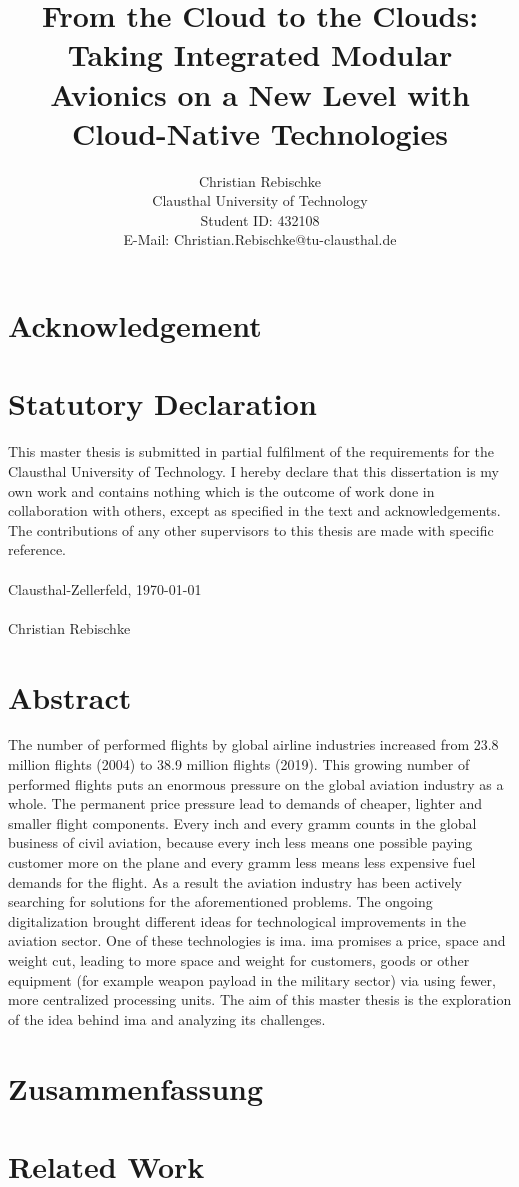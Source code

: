 \documentclass[titlepage]{report}
\title{From the Cloud to the Clouds: Taking Integrated Modular Avionics on a New Level with Cloud-Native Technologies}
\author{Christian Rebischke\\
Clausthal University of Technology\\
Student ID: 432108 \\
E-Mail: Christian.Rebischke@tu-clausthal.de}
\begin{document}
\maketitle
\chapter*{Acknowledgement}
\chapter*{Statutory Declaration}
This master thesis is submitted in partial fulfilment of the requirements for the Clausthal
University of Technology. I hereby declare that this dissertation is my own work and
contains nothing which is the outcome of work done in collaboration with others,
except as specified in the text and acknowledgements. The contributions of any other
supervisors to this thesis are made with specific reference.
\\
\\
Clausthal-Zellerfeld, \today
\\
\\
Christian Rebischke
\chapter*{Abstract}
The number of performed flights by global airline industries increased from 23.8 million flights (2004)
to 38.9 million flights (2019)\cite{STATISTA}. This growing number of performed flights puts an enormous
pressure on the global aviation industry as a whole. The permanent price pressure lead to demands of
cheaper, lighter and smaller flight components\cite{prisaznuk1992integrated}. Every inch and every gramm 
counts in the global business of civil aviation, because every inch less means one possible paying customer 
more on the plane and every gramm less means less expensive fuel demands for the flight. As a result
the aviation industry has been actively searching for solutions for the aforementioned problems.
The ongoing digitalization brought different ideas for technological improvements in the aviation sector.
One of these technologies is \gls{ima}. \gls{ima} promises a price, space and weight cut, leading to more 
space and weight for customers, goods or other equipment (for example weapon payload in the military sector)
via using fewer, more centralized processing units. The aim of this master thesis is the exploration
of the idea behind \gls{ima} and analyzing its challenges.
\chapter*{Zusammenfassung}
\tableofcontents
\chapter{Related Work}
\nocite{*}
\printbibliography{}
\lstlistoflistings{}
\listoftables{}
\listoffigures
\printglossary{}
\end{document}

